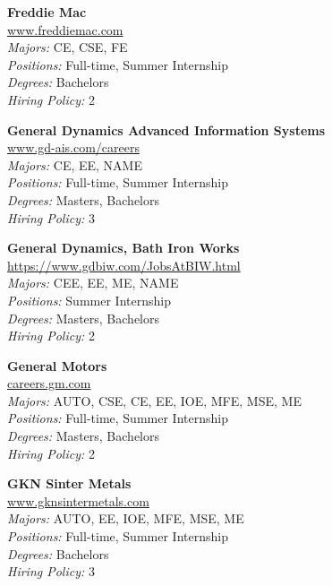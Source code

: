 \documentclass[twoside]{article}
\begin{document}
\begin{center}
\begin{multicols}{3}
\begin{minipage}{.9\columnwidth}{\Large\bf Freddie Mac }\\
	\url{www.freddiemac.com}\\
	\emph{Majors:} CE, CSE, FE\\
	\emph{Positions:} Full-time, Summer Internship\\
	\emph{Degrees:} Bachelors\\
	\emph{Hiring Policy:} 2\\
\end{minipage}
 
\begin{minipage}{.9\columnwidth}{\Large\bf General Dynamics Advanced Information Systems }\\
	\url{www.gd-ais.com/careers}\\
	\emph{Majors:} CE, EE, NAME\\
	\emph{Positions:} Full-time, Summer Internship\\
	\emph{Degrees:} Masters, Bachelors\\
	\emph{Hiring Policy:} 3\\
\end{minipage}
 
\begin{minipage}{.9\columnwidth}{\Large\bf General Dynamics, Bath Iron Works }\\
	\url{https://www.gdbiw.com/JobsAtBIW.html}\\
	\emph{Majors:} CEE, EE, ME, NAME\\
	\emph{Positions:} Summer Internship\\
	\emph{Degrees:} Masters, Bachelors\\
	\emph{Hiring Policy:} 2\\
\end{minipage}
 
\begin{minipage}{.9\columnwidth}{\Large\bf General Motors }\\
	\url{careers.gm.com}\\
	\emph{Majors:} AUTO, CSE, CE, EE, IOE, MFE, MSE, ME\\
	\emph{Positions:} Full-time, Summer Internship\\
	\emph{Degrees:} Masters, Bachelors\\
	\emph{Hiring Policy:} 2\\
\end{minipage}
 
\begin{minipage}{.9\columnwidth}{\Large\bf GKN Sinter Metals }\\
	\url{www.gknsintermetals.com}\\
	\emph{Majors:} AUTO, EE, IOE, MFE, MSE, ME\\
	\emph{Positions:} Full-time, Summer Internship\\
	\emph{Degrees:} Bachelors\\
	\emph{Hiring Policy:} 3\\
\end{minipage}
 

\end{multicols}
\end{center}
\end{document}
